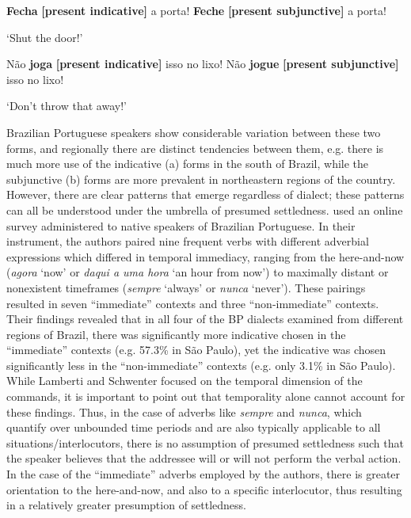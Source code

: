\documentclass[output=paper,colorlinks,citecolor=brown]{langscibook}
\begin{document}
\begin{exe}
\ex\label{ex:hoff:fechafeche}
\begin{xlist}
\ex 	\textbf{Fecha} \textbf{[present indicative]} a porta! 
\ex \textbf{Feche} \textbf{[present subjunctive]} a porta!
\end{xlist}
`Shut the door!'
\end{exe}

\begin{exe}
\ex\label{ex:hoff:jogajogue}
\begin{xlist}
\ex Não \textbf{joga} \textbf{[present indicative]} isso no lixo!
\ex Não \textbf{jogue} \textbf{[present subjunctive]} isso no lixo!
\end{xlist}
`Don’t throw that away!'
\end{exe}
	
Brazilian Portuguese speakers show considerable variation between these two forms, and regionally there are distinct tendencies between them, e.g. there is much more use of the indicative (a) forms in the south of Brazil, while the subjunctive (b) forms are more prevalent in northeastern regions of the country. However, there are clear patterns that emerge regardless of dialect; these patterns can all be understood under the umbrella of presumed settledness. 
\citet{LambertiSchwenter2018} used an online survey administered to native speakers of Brazilian Portuguese. In their instrument, the authors paired nine frequent verbs with different adverbial expressions which differed in temporal immediacy, ranging from the here-and-now (\textit{agora} `now' or \textit{daqui a uma hora} `an hour from now') to maximally distant or nonexistent timeframes (\textit{sempre} `always' or \textit{nunca} `never'). These pairings resulted in seven ``immediate'' contexts and three ``non-immediate'' contexts. Their findings revealed that in all four of the BP dialects examined from different regions of Brazil, there was significantly more indicative chosen in the ``immediate'' contexts (e.g. 57.3\% in S\~{a}o Paulo), yet the indicative was chosen significantly less in the ``non-immediate'' contexts (e.g. only 3.1\% in S\~{a}o Paulo). While Lamberti and Schwenter focused on the temporal dimension of the commands, it is important to point out that temporality alone cannot account for these findings. Thus, in the case of adverbs like \textit{sempre} and \textit{nunca}, which quantify over unbounded time periods and are also typically applicable to all situations/interlocutors, there is no assumption of presumed settledness such that the speaker believes that the addressee will or will not perform the verbal action. In the case of the ``immediate'' adverbs employed by the authors, there is greater orientation to the here-and-now, and also to a specific interlocutor, thus resulting in a relatively greater presumption of settledness. 
\end{document}
